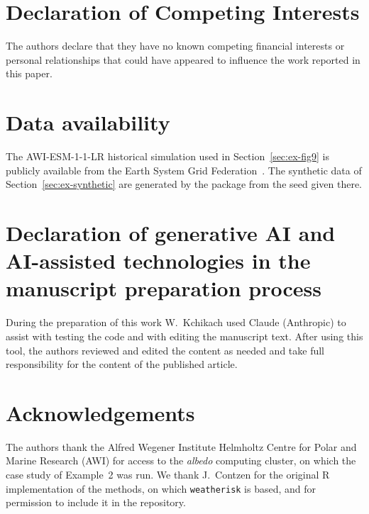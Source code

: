 \documentclass[preprint,12pt,a4paper]{elsarticle}
\newcommand{\revn}[1]{{#1}}
\begin{document}
\section*{\revn{Declaration of Competing Interests}}

\revn{The authors declare that they have no known competing financial
interests or personal relationships that could have appeared to
influence the work reported in this paper.}

\section*{Data availability}
The AWI-ESM-1-1-LR historical simulation used in
Section~\ref{sec:ex-fig9} is publicly available from the Earth
System Grid Federation~\cite{danek2020}. The synthetic data of
Section~\ref{sec:ex-synthetic} are generated by the package from the
seed given there.

\section*{Declaration of generative AI and AI-assisted technologies in the manuscript preparation process}
During the preparation of this work W.~Kchikach used Claude
(Anthropic) to assist with testing the code and with editing the
manuscript text. After using this
tool, the authors reviewed and edited the content as needed and
take full responsibility for the content of the published article.

\section*{Acknowledgements}
The authors thank the Alfred Wegener Institute Helmholtz Centre for
Polar and Marine Research (AWI) for access to the \emph{albedo}
computing cluster, on which the case study of Example~2 was run. We thank J.~Contzen for the original R implementation of
the methods, on which \texttt{weatherisk} is based, and for permission to include it in the repository.
\end{document}
